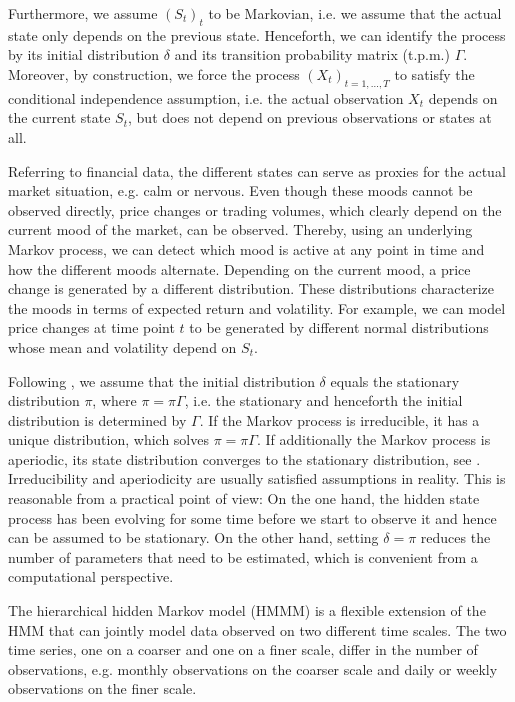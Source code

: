 \documentclass[article]{jss}
\begin{document}
Furthermore, we assume $(S_t)_t$ to be Markovian, i.e. we assume that the actual state only depends on the previous state. Henceforth, we can identify the process by its initial distribution $\delta$ and its transition probability matrix (t.p.m.) $\Gamma$. Moreover, by construction, we force the process $(X_t)_{t = 1, \ldots, T}$ to satisfy the conditional independence assumption, i.e. the actual observation $X_t$ depends on the current state $S_t$, but does not depend on previous observations or states at all.

Referring to financial data, the different states can serve as proxies for the actual market situation, e.g. calm or nervous. Even though these moods cannot be observed directly, price changes or trading volumes, which clearly depend on the current mood of the market, can be observed. Thereby, using an underlying Markov process, we can detect which mood is active at any point in time and how the different moods alternate. Depending on the current mood, a price change is generated by a different distribution. These distributions characterize the moods in terms of expected return and volatility. For example, we can model price changes at time point $t$ to be generated by different normal distributions whose mean and volatility depend on $S_t$.

Following \cite{zuc16}, we assume that the initial distribution $\delta$ equals the stationary distribution $\pi$, where $\pi = \pi \Gamma$, i.e. the stationary and henceforth the initial distribution is determined by $\Gamma$. If the Markov process is irreducible, it has a unique distribution, which solves $\pi = \pi \Gamma$. If
additionally the Markov process is aperiodic, its state distribution converges to the stationary distribution, see \cite{nor97}. Irreducibility and aperiodicity are usually satisfied assumptions in reality. This is reasonable from a practical point of view: On the one hand, the hidden state process has been evolving for some time before we start to observe it and hence can be assumed to be stationary. On the other hand, setting $\delta=\pi$ reduces the number of parameters that need to be estimated, which is convenient from a computational perspective.

The hierarchical hidden Markov model (HMMM) is a flexible extension of the HMM  that can jointly model data observed on two different time scales. The two time series, one on a coarser and one on a finer scale, differ in the number of observations, e.g. monthly observations on the coarser scale and daily or weekly observations on the finer scale. 
\end{document}
